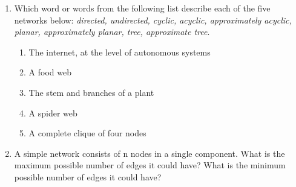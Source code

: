 \documentclass{amsart}
\theoremstyle{definition}
\theoremstyle{remark}
\numberwithin{equation}{section}
\begin{document}
\begin{enumerate}
\clearpage
\item Which word or words from the following list describe each of the five networks below: {\em directed, undirected, cyclic, acyclic, approximately acyclic, planar, approximately planar, tree, approximate tree}.
\begin{enumerate}
\item The internet, at the level of autonomous systems
\item A food web
\item The stem and branches of a plant
\item A spider web
\item A complete clique of four nodes
\end{enumerate}

\vspace{5cm}

\clearpage
\item A simple network consists of n nodes in a single component. What is the maximum possible number of edges it could have? What is the minimum possible number of edges it could have? 

\end{enumerate}
\end{document}
